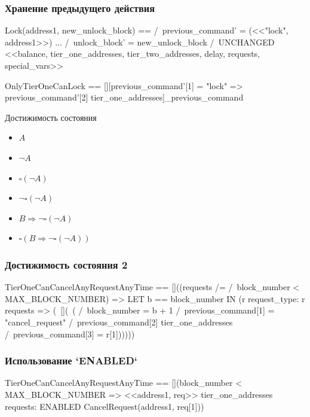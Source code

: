 \documentclass[14pt,aspectratio=169,hyperref={pdftex,unicode},xcolor=dvipsnames]{beamer}
\begin{document}
\begin{frame}[fragile]
\frametitle{Хранение предыдущего действия}
\begin{code}
Lock(address1, new_unlock_block) ==
    /\ previous_command' = (<<"lock", address1>>) 
	...
    /\ unlock_block' = new_unlock_block
    /\ UNCHANGED <<balance, tier_one_addresses, tier_two_addresses, delay, requests, special_vars>>

OnlyTierOneCanLock ==
    [][previous_command'[1] = "lock" => previous_command'[2] \in tier_one_addresses]_previous_command
\end{code}
\end{frame}

\begin{frame}[t]{Достижимость состояния}
\begin{itemize}
\item<1-> $A$
\item<2-> $\neg A$
\item<3-> $\square(\neg A)$
\item<4-> $\neg \square(\neg A)$
\item<5-> $B \Rightarrow \neg \square(\neg A)$
\item<6-> $\square(B \Rightarrow \neg \square(\neg A))$
\end{itemize}
\end{frame}

\begin{frame}[fragile]
\frametitle{Достижимость состояния 2}
\small
\begin{code}
TierOneCanCancelAnyRequestAnyTime ==
[]((requests /= {} /\ block_number < MAX_BLOCK_NUMBER) => 
        LET b == block_number IN 
            (\A r \in request_type:
                r \in requests =>
                (~[](~(
                    /\ block_number = b + 1
                    /\ previous_command[1] = "cancel_request"
                    /\ previous_command[2] \in tier_one_addresses
                    /\ previous_command[3] = r[1])))))
\end{code}
\end{frame}

\begin{frame}[fragile]
\frametitle{Использование `ENABLED`}
\begin{code}
TierOneCanCancelAnyRequestAnyTime ==
    [](block_number < MAX_BLOCK_NUMBER
        => \A <<address1, req>> \in tier_one_addresses \X requests:
        ENABLED CancelRequest(address1, req[1]))
\end{code}
\end{frame}
\end{document}

